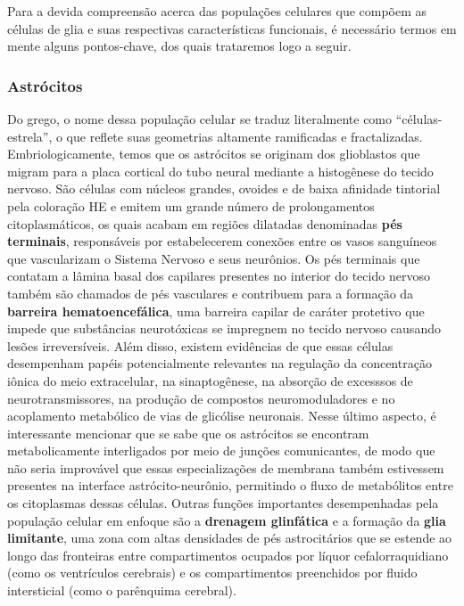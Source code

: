 \documentclass[
]{book}
\begin{document}
Para a devida compreensão acerca das populações celulares que compõem as células de glia e suas respectivas características funcionais, é necessário termos em mente alguns pontos-chave, dos quais trataremos logo a seguir.

\hypertarget{astruxf3citos}{%
\subsubsection*{Astrócitos}\label{astruxf3citos}}

Do grego, o nome dessa população celular se traduz literalmente como ``células-estrela'', o que reflete suas geometrias altamente ramificadas e fractalizadas. Embriologicamente, temos que os astrócitos se originam dos glioblastos que migram para a placa cortical do tubo neural mediante a histogênese do tecido nervoso. São células com núcleos grandes, ovoides e de baixa afinidade tintorial pela coloração HE e emitem um grande número de prolongamentos citoplasmáticos, os quais acabam em regiões dilatadas denominadas \textbf{pés terminais}, responsáveis por estabelecerem conexões entre os vasos sanguíneos que vascularizam o Sistema Nervoso e seus neurônios. Os pés terminais que contatam a lâmina basal dos capilares presentes no interior do tecido nervoso também são chamados de pés vasculares e contribuem para a formação da \textbf{barreira hematoencefálica}, uma barreira capilar de caráter protetivo que impede que substâncias neurotóxicas se impregnem no tecido nervoso causando lesões irreversíveis. Além disso, existem evidências de que essas células desempenham papéis potencialmente relevantes na regulação da concentração iônica do meio extracelular, na sinaptogênese, na absorção de excesssos de neurotransmissores, na produção de compostos neuromoduladores e no acoplamento metabólico de vias de glicólise neuronais. Nesse último aspecto, é interessante mencionar que se sabe que os astrócitos se encontram metabolicamente interligados por meio de junções comunicantes, de modo que não seria improvável que essas especializações de membrana também estivessem presentes na interface astrócito-neurônio, permitindo o fluxo de metabólitos entre os citoplasmas dessas células. Outras funções importantes desempenhadas pela população celular em enfoque são a \textbf{drenagem glinfática} e a formação da \textbf{glia limitante}, uma zona com altas densidades de pés astrocitários que se estende ao longo das fronteiras entre compartimentos ocupados por líquor cefalorraquidiano (como os ventrículos cerebrais) e os compartimentos preenchidos por fluido intersticial (como o parênquima cerebral).
\end{document}
